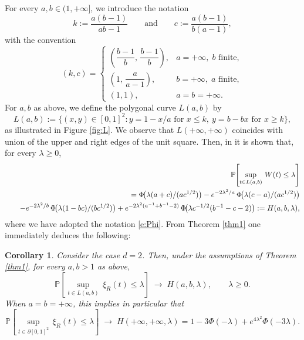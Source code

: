 \documentclass[11pt,a4paper]{article}
\numberwithin{equation}{section}
\theoremstyle{plain}
\theoremstyle{plain}
\newtheorem{coro}[theo]{Corollary}
\newenvironment{corollary}%
  {\begin{mdframed}[backgroundcolor=white]\begin{coro}}%
  {\end{coro}\par\smallskip\end{mdframed}}
\theoremstyle{plain}
\theoremstyle{plain}
\theoremstyle{definition}
\theoremstyle{definition}
\begin{document}
For every $a,b\in (1,+\infty]$, we introduce the notation
\[
k := \frac{a(b-1)}{ab-1}
\qquad\text{and}\qquad
c:= \frac{a(b-1)}{b(a-1)},
\]
with the convention
\[
(k,c)
=
\begin{cases}
\left(\dfrac{b-1}{b},\, \dfrac{b-1}{b}\right), & a = +\infty,\; b \text{ finite}, \\[6pt]
\left(1,\, \dfrac{a}{a-1}\right),              & b = +\infty,\; a \text{ finite}, \\[6pt]
(1,1),                                         & a = b = +\infty.
\end{cases}
\]
For $a,b$ as above, we define the polygonal curve $L(a,b)$ by
\[
L(a,b)
:= \{(x,y)\in[0,1]^2 : y= 1-x/a \text{ for } x\le k,\ 
                         y = b-bx \text{ for } x\ge k\},
\]
as illustrated in Figure \ref{fig:L}. We observe that 
$L(+\infty,+\infty)$ coincides with union of the upper and right edges of the unit square.
Then, in \cite[Theorem 2]{YehWiener} it is shown that, for every $\lambda\ge 0$,
\begin{eqnarray}\label{e:repf}
 &&\mathbb{P}\!\left[\sup_{t\in L(a,b)}\, W(t)\leq \lambda\right] \\ \notag
 &&= \Phi\!\big(\lambda(a+c)/(ac^{1/2})\big)
    - e^{-2\lambda^2/a}\,\Phi\!\big(\lambda(c-a)/(ac^{1/2})\big) \\ \notag 
 &&\quad -e^{-2\lambda^2/b}\,\Phi\!\big(\lambda(1-bc)/(bc^{1/2})\big)
    +e^{-2\lambda^2(a^{-1}+b^{-1}-2)}\,
     \Phi\!\big(\lambda c^{-1/2}(b^{-1}-c-2 )\big)
:= H(a,b,\lambda),
\end{eqnarray}
where we have adopted the notation \eqref{e:Phi}.
From Theorem \ref{thm1} one immediately deduces the following:

\smallskip
\par\noindent
\begin{minipage}{\textwidth}
\begin{corollary}\label{Cor1}
Consider the case $d=2$. Then, under the assumptions of Theorem \ref{thm1},
for every $a,b>1$ as above,
\[
\mathbb{P}\!\left[\sup_{t\in L(a,b)}\, \xi_R(t)\leq \lambda\right] 
\;\longrightarrow\; H(a,b,\lambda),
\qquad \lambda\ge 0.
\]
When $a=b=+\infty$, this implies in particular that
\[
\mathbb{P}\!\left[\sup_{t\in \partial[0,1]^2}\, \xi_R(t)\leq \lambda\right]
\;\longrightarrow\; H(+\infty,+\infty,\lambda)
= 1-3\Phi(-\lambda)+e^{4\lambda^2}\Phi(-3\lambda).
\]
\end{corollary}
\end{minipage}

\medskip
\end{document}

